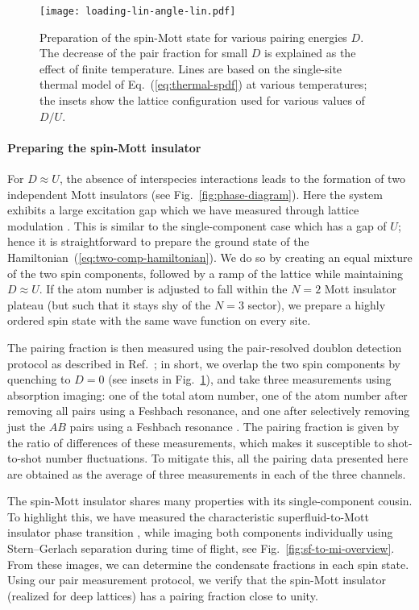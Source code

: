 \documentclass[aps,prl,twocolumn]{revtex4-1}
\begin{document}
\begin{figure}
    \centering
    \texttt{[image: loading-lin-angle-lin.pdf]}
    \caption{Preparation of the spin-Mott state for various pairing energies $D$.  The decrease of the pair fraction for small $D$ is explained as the effect of finite temperature. Lines are based on the single-site thermal model of Eq.~(\ref{eq:thermal-spdf}) at various temperatures; the insets show the lattice configuration used for various values of $D/U$.}
    \label{fig:loading-spin-mott}
\end{figure}


\paragraph*{Preparing the spin-Mott insulator}
For $D \approx U$, the absence of interspecies interactions leads to the formation of two independent Mott insulators (see Fig.~\ref{fig:phase-diagram}). Here the system exhibits a large excitation gap which we have measured through lattice modulation \cite{Supplemental}. This is similar to the single-component case which has a gap of $U$; hence it is straightforward to prepare the ground state of the Hamiltonian~(\ref{eq:two-comp-hamiltonian}). We do so by creating an equal mixture of the two spin components, followed by a ramp of the lattice while maintaining $D \approx U$. If the atom number is adjusted to fall within the $N = 2$ Mott insulator plateau (but such that it stays shy of the $N = 3$ sector), we prepare a highly ordered spin state with the same wave function on every site.

The pairing fraction is then measured using the pair-resolved doublon detection protocol as described in Ref.~\cite{Chung21}; in short, we overlap the two spin components by quenching to $D = 0$ (see insets in Fig.~\ref{fig:loading-spin-mott}), and take three measurements using absorption imaging: one of the total atom number, one of the atom number after removing all pairs using a Feshbach resonance, and one after selectively removing just the $AB$ pairs using a Feshbach resonance \cite{kaufman2009radio}. The pairing fraction is given by the ratio of differences of these measurements, which makes it susceptible to shot-to-shot number fluctuations. To mitigate this, all the pairing data presented here are obtained as the average of three measurements in each of the three channels.

The spin-Mott insulator shares many properties with its single-component cousin. To highlight this, we have measured the characteristic superfluid-to-Mott insulator phase transition \cite{Greiner02}, while imaging both components individually using Stern--Gerlach separation during time of flight, see Fig.~\ref{fig:sf-to-mi-overview}. From these images, we can determine the condensate fractions in each spin state. Using our pair measurement protocol, we verify that the spin-Mott insulator (realized for deep lattices) has a pairing fraction close to unity.
\end{document}
